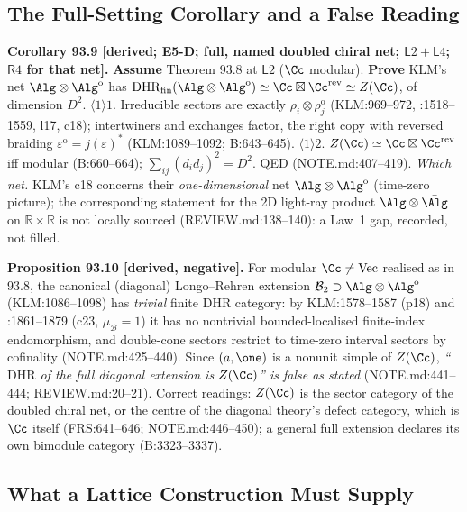 \subsection{The Full-Setting Corollary and a False Reading}

\textbf{Corollary 93.9 [derived; E5-D; full, named doubled chiral net; \(\mathsf L2{+}\mathsf L4\); \(\mathsf R4\) for that net].}
\textbf{Assume} Theorem 93.8 at \(\mathsf L2\) (\(\Cc\) modular).  \textbf{Prove} KLM's net \(\Alg\otimes\Alg^{\mathrm o}\) has
\(\mathrm{DHR}_{\mathrm{fin}}(\Alg\otimes\Alg^{\mathrm o})\simeq\Cc\boxtimes\Cc^{\mathrm{rev}}\simeq Z(\Cc)\), of dimension \(D^2\).
\(\langle1\rangle1\). Irreducible sectors are exactly \(\rho_i\otimes\rho_j^{\mathrm o}\) (KLM:969--972, :1518--1559, l17, c18);
intertwiners and exchanges factor, the right copy with reversed braiding \(\varepsilon^{\mathrm o}=j(\varepsilon)^*\)
(KLM:1089--1092; B:643--645).  \(\langle1\rangle2\). \(Z(\Cc)\simeq\Cc\boxtimes\Cc^{\mathrm{rev}}\) iff modular (B:660--664);
\(\sum_{ij}(d_id_j)^2=D^2\).  QED (NOTE.md:407--419).
\emph{Which net.}  KLM's c18 concerns their \emph{one-dimensional} net \(\Alg\otimes\Alg^{\mathrm o}\) (time-zero picture); the
corresponding statement for the 2D light-ray product \(\Alg\otimes\bar\Alg\) on \(\mathbb R\times\mathbb R\) is not locally sourced
(REVIEW.md:138--140): a Law~1 gap, recorded, not filled.

\textbf{Proposition 93.10 [derived, negative].}  For modular \(\Cc\ne\mathrm{Vec}\) realised as in 93.8, the canonical
(diagonal) Longo--Rehren extension \(\mathcal B_2\supset\Alg\otimes\Alg^{\mathrm o}\) (KLM:1086--1098) has \emph{trivial} finite
DHR category: by KLM:1578--1587 (p18) and :1861--1879 (c23, \(\mu_{\mathcal B}=1\)) it has no nontrivial bounded-localised
finite-index endomorphism, and double-cone sectors restrict to time-zero interval sectors by cofinality (NOTE.md:425--440).
Since \((a,\one)\) is a nonunit simple of \(Z(\Cc)\), \emph{``\(\mathrm{DHR}\) of the full diagonal extension is \(Z(\Cc)\)'' is false
as stated} (NOTE.md:441--444; REVIEW.md:20--21).  Correct readings: \(Z(\Cc)\) is the sector category of the doubled chiral
net, or the centre of the diagonal theory's defect category, which is \(\Cc\) itself (FRS:641--646; NOTE.md:446--450);
a general full extension declares its own bimodule category (B:3323--3337).

\subsection{What a Lattice Construction Must Supply}

